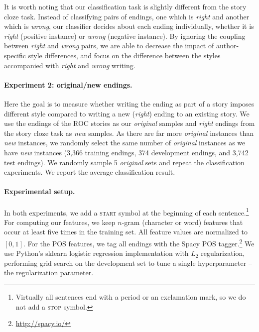 \documentclass[11pt,a4paper]{article}
\newcommand{\resolved}[1]{}
\newcommand{\roy}[1]{{\color{orange}\textsc{[#1 --rs]}}}
\newcommand{\nascomment}[1]{{\color{blue}\textsc{[#1 --nas]}}}
\renewcommand{\roy}[1]{}
\begin{document}
It is worth noting that our classification task is slightly different from the story cloze task. 
Instead of classifying pairs of endings, one which is {\it right} and
another which is {\it wrong}, our classifier decides about each ending
individually, whether it is \emph{right} (positive instance) or
\emph{wrong} (negative instance).
By ignoring the coupling between {\it right} and {\it wrong} pairs, 
we are able to decrease the impact of author-specific style differences,
and focus on the difference between the styles accompanied with {\it right} and {\it wrong} writing.
\resolved{we
are able make a more general claim about the style used when writing
each of the tasks \nascomment{I'm not sure I follow this sentence; can
we be more clear?}.}\roy{Better now?}

\paragraph{Experiment 2: original/new endings.}

Here the goal is to measure whether writing the ending as part of a
story imposes different style compared to writing a new ({\it right}) ending to an existing story.
We use the endings of the ROC stories as our {\it original} samples and {\it right} endings from the story cloze task   \resolved{\nascomment{if you're using the test examples as
  training data, what are you using for test? and development?  I would have thought
  you'd follow the same pattern as above ... }}as {\it new} samples.
As there are far more {\it original} instances than {\it new}
instances, we randomly select the same number of \emph{original}
instances  \resolved{\nascomment{(give the number in parentheses, for train/dev/test)} }as we have
\emph{new} instances (3,366 training endings, 374 development endings, and 3,742 test endings).
We randomly sample 5 {\it original} sets and repeat the classification experiments.
We report the average classification result.

\paragraph{Experimental setup.}
In both experiments, we add a \textsc{start} symbol at the beginning
of each sentence.\footnote{Virtually all sentences end with a period
  or an exclamation mark, so we do not add a \textsc{stop} symbol.}
For computing our features, we keep $n$-gram (character or word) features that occur at least five times in the training set.
All feature values are normalized to $[0, 1]$.
For the POS features, we tag all endings with the Spacy POS tagger.\footnote{\url{http://spacy.io/}}
We use  Python's sklearn logistic regression implementation with $L_2$
regularization, performing grid search on the development set to
tune a single hyperparameter -- the regularization parameter.   \resolved{\nascomment{any other hyperparameters?  if
  not, say this is the only one.  else explain what they are.}}
\end{document}
